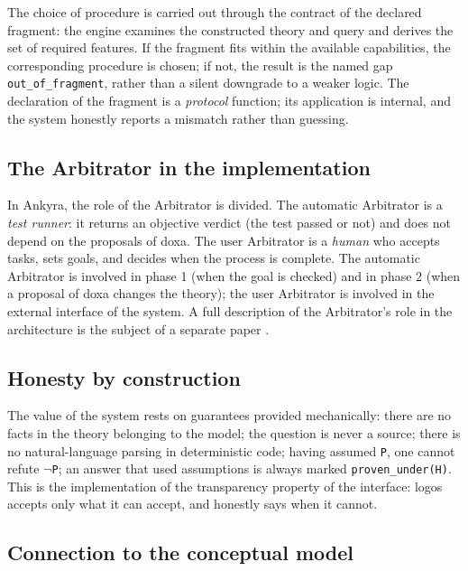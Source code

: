 \documentclass[12pt,a4paper]{article}
\begin{document}
The choice of procedure is carried out through the contract of the declared
fragment: the engine examines the constructed theory and query and derives the
set of required features. If the fragment fits within the available
capabilities, the corresponding procedure is chosen; if not, the result is the
named gap \texttt{out\_of\_fragment}, rather than a silent downgrade to a
weaker logic. The declaration of the fragment is a \emph{protocol} function;
its application is internal, and the system honestly reports a mismatch rather
than guessing.

\subsection{The Arbitrator in the implementation}
\label{sec:arbiter_impl}

In Ankyra, the role of the Arbitrator is divided. The automatic Arbitrator is
a \emph{test runner}: it returns an objective verdict (the test passed or not)
and does not depend on the proposals of doxa. The user Arbitrator is a
\emph{human} who accepts tasks, sets goals, and decides when the process is
complete. The automatic Arbitrator is involved in phase 1 (when the goal is
checked) and in phase 2 (when a proposal of doxa changes the theory); the user
Arbitrator is involved in the external interface of the system. A full
description of the Arbitrator's role in the architecture is the subject of a
separate paper \cite{ankyra_paper}.

\subsection{Honesty by construction}
\label{sec:honesty}

The value of the system rests on guarantees provided mechanically: there are
no facts in the theory belonging to the model; the question is never a source;
there is no natural-language parsing in deterministic code; having assumed
\texttt{P}, one cannot refute \texttt{$\neg$P}; an answer that used
assumptions is always marked \texttt{proven\_under(H)}. This is the
implementation of the transparency property of the interface: logos accepts
only what it can accept, and honestly says when it cannot.

\subsection{Connection to the conceptual model}
\label{sec:model_link}
\end{document}
